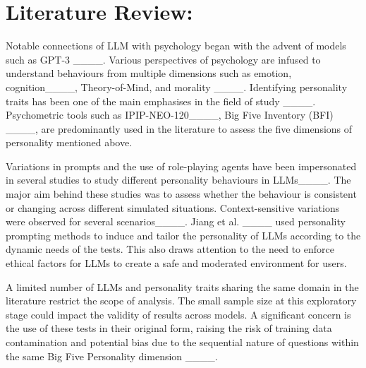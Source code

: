 \section{Literature Review: }
Notable connections of LLM with psychology began with the advent of models such as GPT-3 ____. Various perspectives of psychology are infused to understand behaviours from multiple dimensions such as emotion, cognition____, Theory-of-Mind, and morality ____. Identifying personality traits has been one of the main emphasises in the field of study ____. Psychometric tools such as IPIP-NEO-120____, Big Five Inventory (BFI) ____, are predominantly used in the literature to assess the five dimensions of personality mentioned above.

Variations in prompts and the use of role-playing agents have been impersonated in several studies to study different personality behaviours in LLMs____. The major aim behind these studies was to assess whether the behaviour is consistent or changing across different simulated situations. Context-sensitive variations were observed for several scenarios____. Jiang et al. ____ used personality prompting methods to induce and tailor the personality of LLMs according to the dynamic needs of the tests. This also draws attention to the need to enforce ethical factors for LLMs to create a safe and moderated environment for users. 

A limited number of LLMs and personality traits sharing the same domain in the literature restrict the scope of analysis. The small sample size at this exploratory stage could impact the validity of results across models. A significant concern is the use of these tests in their original form, raising the risk of training data contamination and potential bias due to the sequential nature of questions within the same Big Five Personality dimension ____.

